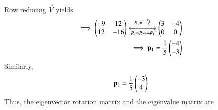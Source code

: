 \begin{enumerate}
\begin{align}
\end{align}
Row reducing $\vec{V}$ yields
\begin{align}
\implies
\begin{pmatrix}-9&12\\12&-16\end{pmatrix}\xleftrightarrow[R_2=R_2+4R_1]{R_1=-\frac{R_1}{3}}\begin{pmatrix}3&-4\\0&0\end{pmatrix}\\
\implies\mathbf{p}_1=\frac{1}{5}\begin{pmatrix}-4\\-3\end{pmatrix} \label{eq:conics/ex/solution/eq2.3}
\end{align}
Similarly, 
\begin{align}
\mathbf{p}_2=\frac{1}{5}\begin{pmatrix}-3\\4\end{pmatrix} 
\end{align}
%
Thus, the eigenvector rotation matrix and the eigenvalue matrix are

\end{enumerate}
